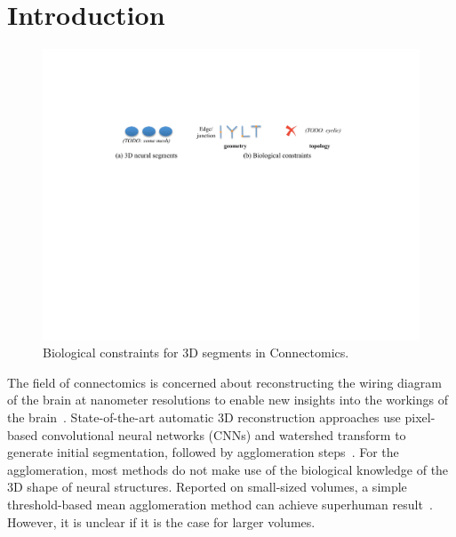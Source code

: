 \section{Introduction}

\begin{figure}[t]
	\centering
	\includegraphics[width=\linewidth]{./figures/bc/teaser_bc_v2.pdf}
	\caption{Biological constraints for 3D segments in Connectomics.}
	\label{fig:bc}
\end{figure}


The field of connectomics is concerned about reconstructing the wiring diagram of the brain at nanometer resolutions to enable new insights into the workings of the brain~\cite{haehn2017scalable,kasthuri2015saturated}. 
State-of-the-art automatic 3D reconstruction approaches use pixel-based convolutional neural networks (CNNs) and watershed transform to generate initial segmentation, followed by agglomeration steps~\cite{seymour2016rhoananet,lee2015recursive,nunez2014graph,parag2017anisotropic,ronneberger2015u,zlateski2015image}.
For the agglomeration, most methods do not make use of the biological knowledge of the 3D shape of neural structures.
Reported on small-sized volumes, a simple threshold-based mean agglomeration method can achieve superhuman result~\cite{lee2017superhuman}.
However, it is unclear if it is the case for larger volumes.


